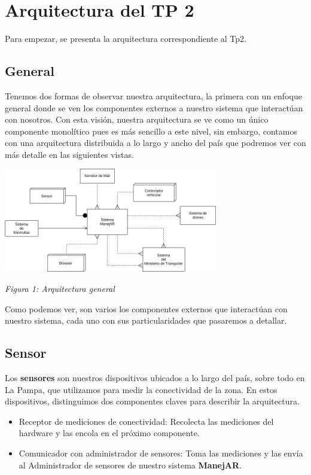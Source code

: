 \section{Arquitectura del TP 2}

Para empezar, se presenta la arquitectura correspondiente al Tp2.

\subsection{General}

Tenemos dos formas de observar nuestra arquitectura, la primera con un enfoque general donde se ven
los componentes externos a nuestro sistema que interactúan con nosotros. Con 
esta visión, nuestra arquitectura se ve como un único componente monolítico pues es más sencillo a
este nivel, sin embargo, contamos con una arquitectura distribuida a lo largo y ancho del país 
que podremos ver con más detalle en las siguientes vistas.

\centerline{\includegraphics[width=0.7\textwidth]{./imagenes/arquitectura_tp2/general.png} } 
\centerline{\textit{Figura 1: Arquitectura general}}


Como podemos ver, son varios los componentes externos que interactúan con 
nuestro sistema, cada uno con sus particularidades que pasaremos a detallar.

\subsection{Sensor}
Los \textbf{sensores} son nuestros dispositivos ubicados a lo largo del país, sobre todo en La 
Pampa, que utilizamos para medir la conectividad de la zona.
En estos dispositivos, distinguimos dos componentes claves para describir la 
arquitectura.

\begin{itemize}
  \item Receptor de mediciones de conectividad: Recolecta las mediciones del 
  hardware y las encola en el próximo componente.
  
  \item Comunicador con administrador de sensores: Toma las mediciones y las 
  envía al Administrador de sensores de nuestro sistema \textbf{ManejAR}.
\end{itemize}

